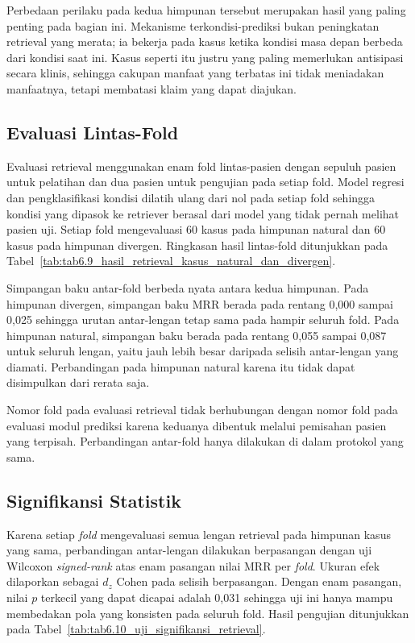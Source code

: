 Perbedaan perilaku pada kedua himpunan tersebut merupakan hasil yang paling penting pada bagian ini. Mekanisme terkondisi-prediksi bukan peningkatan retrieval yang merata; ia bekerja pada kasus ketika kondisi masa depan berbeda dari kondisi saat ini.
Kasus seperti itu justru yang paling memerlukan antisipasi secara klinis, sehingga cakupan manfaat yang terbatas ini tidak meniadakan manfaatnya, tetapi
membatasi klaim yang dapat diajukan.

\subsection{Evaluasi Lintas-Fold}
\label{subsec:bab6-evaluasi-crossfold-retrieval}

Evaluasi retrieval menggunakan enam fold lintas-pasien dengan sepuluh pasien untuk pelatihan dan dua pasien untuk pengujian pada setiap fold. Model regresi dan
pengklasifikasi kondisi dilatih ulang dari nol pada setiap fold sehingga kondisi yang dipasok ke retriever berasal dari model yang tidak pernah melihat pasien
uji. Setiap fold mengevaluasi 60 kasus pada himpunan natural dan 60 kasus pada himpunan divergen. Ringkasan hasil lintas-fold ditunjukkan pada
Tabel~\ref{tab:tab6.9_hasil_retrieval_kasus_natural_dan_divergen}.



Simpangan baku antar-fold berbeda nyata antara kedua himpunan. Pada himpunan divergen, simpangan baku MRR berada pada rentang 0,000 sampai 0,025 sehingga urutan
antar-lengan tetap sama pada hampir seluruh fold. Pada himpunan natural, simpangan baku berada pada rentang 0,055 sampai 0,087 untuk seluruh lengan, yaitu jauh
lebih besar daripada selisih antar-lengan yang diamati. Perbandingan pada himpunan natural karena itu tidak dapat disimpulkan dari rerata saja.

Nomor fold pada evaluasi retrieval tidak berhubungan dengan nomor fold pada evaluasi modul prediksi karena keduanya dibentuk melalui pemisahan pasien yang
terpisah. Perbandingan antar-fold hanya dilakukan di dalam protokol yang sama.

\subsection{Signifikansi Statistik}
\label{subsec:bab6-signifikansi-retrieval}

Karena setiap \textit{fold} mengevaluasi semua lengan retrieval pada himpunan kasus yang sama, perbandingan antar-lengan dilakukan berpasangan dengan uji
Wilcoxon \textit{signed-rank} atas enam pasangan nilai MRR per \textit{fold}. Ukuran efek dilaporkan sebagai $d_z$ Cohen pada selisih berpasangan. Dengan enam pasangan, nilai $p$
terkecil yang dapat dicapai adalah 0,031 sehingga uji ini hanya mampu membedakan pola yang konsisten pada seluruh fold. Hasil pengujian ditunjukkan pada
Tabel~\ref{tab:tab6.10_uji_signifikansi_retrieval}.

